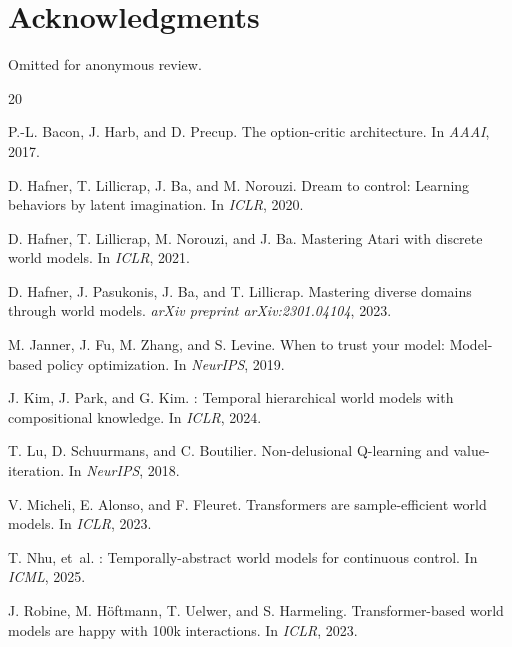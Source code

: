 \documentclass[letterpaper]{article}
\begin{document}
\section*{Acknowledgments}

Omitted for anonymous review.



\begin{thebibliography}{20}

P.-L. Bacon, J. Harb, and D. Precup.
\newblock The option-critic architecture.
\newblock In \emph{AAAI}, 2017.

D. Hafner, T. Lillicrap, J. Ba, and M. Norouzi.
\newblock Dream to control: Learning behaviors by latent imagination.
\newblock In \emph{ICLR}, 2020.

D. Hafner, T. Lillicrap, M. Norouzi, and J. Ba.
\newblock Mastering {A}tari with discrete world models.
\newblock In \emph{ICLR}, 2021.

D. Hafner, J. Pasukonis, J. Ba, and T. Lillicrap.
\newblock Mastering diverse domains through world models.
\newblock \emph{arXiv preprint arXiv:2301.04104}, 2023.

M. Janner, J. Fu, M. Zhang, and S. Levine.
\newblock When to trust your model: Model-based policy optimization.
\newblock In \emph{NeurIPS}, 2019.

J. Kim, J. Park, and G. Kim.
: Temporal hierarchical world models with compositional knowledge.
\newblock In \emph{ICLR}, 2024.

T. Lu, D. Schuurmans, and C. Boutilier.
\newblock Non-delusional {Q}-learning and value-iteration.
\newblock In \emph{NeurIPS}, 2018.

V. Micheli, E. Alonso, and F. Fleuret.
\newblock Transformers are sample-efficient world models.
\newblock In \emph{ICLR}, 2023.

T. Nhu, et~al.
: Temporally-abstract world models for continuous control.
\newblock In \emph{ICML}, 2025.

J. Robine, M. H{\"o}ftmann, T. Uelwer, and S. Harmeling.
\newblock Transformer-based world models are happy with 100k interactions.
\newblock In \emph{ICLR}, 2023.


\end{thebibliography}
\end{document}
